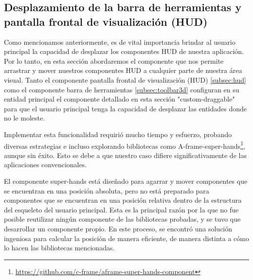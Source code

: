 \documentclass[a4paper, 11pt]{book}
\begin{document}
\subsection{Desplazamiento de la barra de herramientas y pantalla frontal de visualización (HUD)}
\label{subsec:customDraggable}
Como mencionamos anteriormente, es de vital importancia brindar al usuario principal la capacidad de desplazar los componentes HUD de nuestra aplicación. Por lo tanto, en esta sección abordaremos el componente que nos permite arrastrar y mover nuestros componentes HUD a cualquier parte de nuestra área visual.
Tanto el componente pantalla frontal de visualización (HUD) \ref{subsec:hud} como el componente barra de herramientas \ref{subsec:toolbar3d} configuran en su entidad principal el componente detallado en esta sección "custom-draggable" para que el usuario principal tenga la capacidad de desplazar las entidades donde no le moleste.

Implementar esta funcionalidad requirió mucho tiempo y esfuerzo, probando diversas estrategias e incluso explorando bibliotecas como A-frame-super-hands\footnote{\url{https://github.com/c-frame/aframe-super-hands-component}}, aunque sin éxito. Esto se debe a que nuestro caso difiere significativamente de las aplicaciones convencionales.

El componente super-hands está diseñado para agarrar y mover componentes que se encuentran en una posición absoluta, pero no está preparado para componentes que se encuentran en una posición relativa dentro de la estructura del esqueleto del usuario principal. Esta es la principal razón por la que no fue posible reutilizar ningún componente de las bibliotecas probadas, y se tuvo que desarrollar un componente propio. En este proceso, se encontró una solución ingeniosa para calcular la posición de manera eficiente, de manera distinta a cómo lo hacen las bibliotecas mencionadas. 
\end{document}
